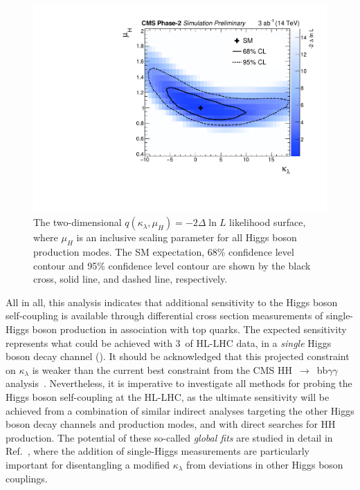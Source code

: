 \begin{figure}
  \centering
  \includegraphics[width=.6\textwidth]{Figures/cms/trilinear/CMS-PAS-FTR-18-020_Figure_008.pdf}
  \caption[Two-dimensional likelihood scan in $\kappa_\lambda$-vs-$\mu_H$]
  {
    The two-dimensional $q(\kappa_\lambda,\mu_H)=-2\Delta \ln L$ likelihood surface, where $\mu_H$ is an inclusive scaling parameter for all Higgs boson production modes. The SM expectation, 68\%  confidence level contour and 95\% confidence level contour are shown by the black cross, solid line, and dashed line, respectively.
  }
  \label{fig:trilinear_2d}
\end{figure}

All in all, this analysis indicates that additional sensitivity to the Higgs boson self-coupling is available through differential cross section measurements of single-Higgs boson production in association with top quarks. The expected sensitivity represents what could be achieved with 3~\abinv of HL-LHC data, in a \textit{single} Higgs boson decay channel (\Hgg). It should be acknowledged that this projected constraint on $\kappa_\lambda$ is weaker than the current best constraint from the CMS HH~$\rightarrow$~bb$\gamma\gamma$ analysis~\cite{Sirunyan:2020xok}. Nevertheless, it is imperative to investigate all methods for probing the Higgs boson self-coupling at the HL-LHC, as the ultimate sensitivity will be achieved from a combination of similar indirect analyses targeting the other Higgs boson decay channels and production modes, and with direct searches for HH production. The potential of these so-called \textit{global fits} are studied in detail in Ref.~\cite{DiVita:2017eyz}, where the addition of single-Higgs measurements are particularly important for disentangling a modified $\kappa_\lambda$ from deviations in other Higgs boson couplings.

